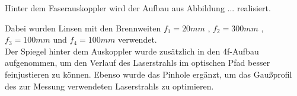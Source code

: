

Hinter dem Faserauskoppler wird der Aufbau aus Abbildung ... realisiert.
 \begin{comment} Abbildung und Nummerierung noch ergänzen!!! \end{comment} 
Dabei wurden Linsen mit den Brennweiten $f_{1}=20mm$ , $f_{2}=300mm$ , $f_{3}=100mm$ und $f_{4}=100mm$ verwendet. \\
Der Spiegel hinter dem Auskoppler wurde zusätzlich in den 4f-Aufbau aufgenommen, um den Verlauf des Laserstrahls im optischen Pfad besser feinjustieren zu können. Ebenso wurde das Pinhole ergänzt, um das Gaußprofil des zur Messung verwendeten Laserstrahls zu optimieren. \\




